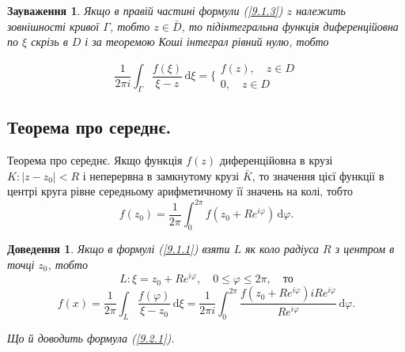 \documentclass[12pt,fleqn]{article}
\theoremstyle{theorem}
\theoremstyle{proof}
\newtheorem*{dov}{Доведення}
\newtheorem{remark}{Зауваження}[section]
\numberwithin{figure}{section}
\numberwithin{equation}{section}
\begin{document}
\begin{remark}\label{remark_9.1.1}
Якщо в правій частині формули (\ref{9.1.3}) $z$ належить зовнішності кривої $\Gamma$, тобто $z \in \bar{D}$, то підінтегральна функція диференційовна по $\xi$ скрізь в $D$ і за теоремою Коші інтеграл рівний нулю, тобто

\[ \frac{1}{2\pi i} \int_{\Gamma} \frac{f(\xi)}{\xi-z}\,\mathrm{d}\xi= \bigg\{ \begin{matrix} f(z), \quad z\in D \\ 0, \quad z \in D \end{matrix} \]

\end{remark}

\subsection{Теорема про середнє.}\label{9.2}
Теорема про середнє. Якщо функція $f(z)$ диференційовна в крузі $K:|z-z_0|<R$ і неперервна в замкнутому крузі $\bar{K}$, то значення цієї функції в центрі круга рівне середньому арифметичному її значень на колі, тобто
\begin{equation}\label{9.2.1}
f(z_0)=\frac{1}{2\pi}\int_{0}^{2\pi}f(z_0+Re^{i\varphi})\,\mathrm{d}\varphi.
\end{equation}

\begin{dov}
Якщо в формулі (\ref{9.1.1}) взяти $L$ як коло радіуса $R$ з центром в точці $z_0$, тобто
\[ L: \xi=z_0+Re^{i\varphi},\quad 0\leq\varphi\leq2\pi,\quad \text{то} \]
\[ f(x)=\frac{1}{2\pi}\int_{L}\frac{f(\varphi)}{\xi-z_0}\,\mathrm{d}\xi = \frac{1}{2\pi i} \int_{0}^{2\pi}\frac{f(z_0+Re^{i\varphi})iRe^{i\varphi}}{Re^{i\varphi}}\,\mathrm{d}\varphi. \]

Що й доводить формула (\ref{9.2.1}).
\end{dov}
\end{document}
